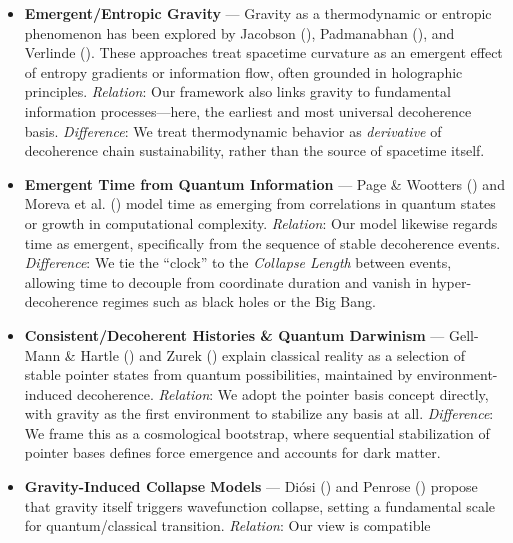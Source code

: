 \documentclass[
]{article}
\begin{document}
\begin{itemize}
\item
  \textbf{Emergent/Entropic Gravity} --- Gravity as a thermodynamic or
  entropic phenomenon has been explored by Jacobson
  (), Padmanabhan
  (), and Verlinde
  (). These approaches treat
  spacetime curvature as an emergent effect of entropy gradients or
  information flow, often grounded in holographic principles.
  \emph{Relation}: Our framework also links gravity to fundamental
  information processes---here, the earliest and most universal
  decoherence basis. \emph{Difference}: We treat thermodynamic behavior
  as \emph{derivative} of decoherence chain sustainability, rather than
  the source of spacetime itself.
\item
  \textbf{Emergent Time from Quantum Information} --- Page \& Wootters
  () and Moreva et al.
  () model time as
  emerging from correlations in quantum states or growth in
  computational complexity. \emph{Relation}: Our model likewise regards
  time as emergent, specifically from the sequence of stable decoherence
  events. \emph{Difference}: We tie the ``clock'' to the \emph{Collapse
  Length} between events, allowing time to decouple from coordinate
  duration and vanish in hyper-decoherence regimes such as black holes
  or the Big Bang.
\item
  \textbf{Consistent/Decoherent Histories \& Quantum Darwinism} ---
  Gell-Mann \& Hartle () and Zurek () explain
  classical reality as a selection of stable pointer states from quantum
  possibilities, maintained by environment-induced decoherence.
  \emph{Relation}: We adopt the pointer basis concept directly, with
  gravity as the first environment to stabilize any basis at all.
  \emph{Difference}: We frame this as a cosmological bootstrap, where
  sequential stabilization of pointer bases defines force emergence and
  accounts for dark matter.
\item
  \textbf{Gravity-Induced Collapse Models} --- Diósi
  () and Penrose
  () propose that gravity
  itself triggers wavefunction collapse, setting a fundamental scale for
  quantum/classical transition. \emph{Relation}: Our view is compatible

\end{itemize}
\end{document}
